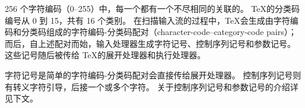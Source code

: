 \documentclass{book}
\begin{document}
256 个字符编码（0--255）中，每一个都有一个不尽相同的关联的。
\TeX 的分类码编号从 0 到 15，共有 16 个类别。
在扫描输入流的过程中，\TeX 会生成由字符编码和分类码组成的字符编码-分类码配对（character-code--category-code pairs）；
而后，自上述配对而始，输入处理器生成字符记号、控制序列记号和参数记号。
这些记号随后被传给 \TeX 的展开处理器和执行处理器。

字符记号是简单的字符编码-分类码配对会直接传给展开处理器。
控制序列记号则有转义字符引导，后接一个或多个字符。
关于控制序列记号和参数记号的介绍详见下文。
\end{document}
